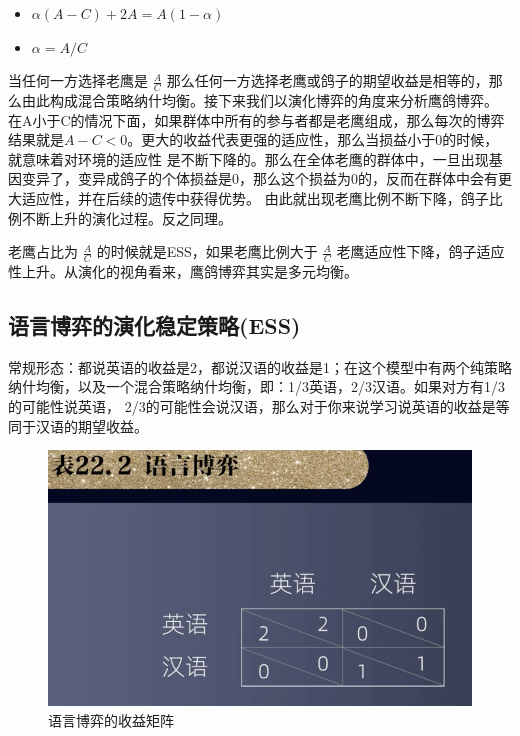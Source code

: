 \documentclass[12pt, a4paper]{article} %
\begin{document}
\begin{CJK*}{UTF8}{gbsn}
        \begin{itemize}
            \item[] $\alpha(A-C)+2A=A(1-\alpha)$
            \item[] $\alpha=A/C$
        \end{itemize}

        当任何一方选择老鹰是 $\frac{A}{C}$ 那么任何一方选择老鹰或鸽子的期望收益是相等的，那么由此构成混合策略纳什均衡。接下来我们以演化博弈的角度来分析鹰鸽博弈。
        在A小于C的情况下面，如果群体中所有的参与者都是老鹰组成，那么每次的博弈结果就是$A-C<0$。更大的收益代表更强的适应性，那么当损益小于0的时候，就意味着对环境的适应性
        是不断下降的。那么在全体老鹰的群体中，一旦出现基因变异了，变异成鸽子的个体损益是0，那么这个损益为0的，反而在群体中会有更大适应性，并在后续的遗传中获得优势。
        由此就出现老鹰比例不断下降，鸽子比例不断上升的演化过程。反之同理。\par

        老鹰占比为 $\frac{A}{C}$ 的时候就是ESS，如果老鹰比例大于 $\frac{A}{C}$ 老鹰适应性下降，鸽子适应性上升。从演化的视角看来，鹰鸽博弈其实是多元均衡。

        \subsection{语言博弈的演化稳定策略(ESS)}

        常规形态：都说英语的收益是2，都说汉语的收益是1；在这个模型中有两个纯策略纳什均衡，以及一个混合策略纳什均衡，即：1/3英语，2/3汉语。如果对方有1/3的可能性说英语，
        2/3的可能性会说汉语，那么对于你来说学习说英语的收益是等同于汉语的期望收益。

        \begin{figure}[htbp]
            \centering
            \includegraphics[width=1\textwidth]{./figures/catch2023-08-05-17.19.58.png}
            \caption{语言博弈的收益矩阵}
        \end{figure}


\end{CJK*}
\end{document}
